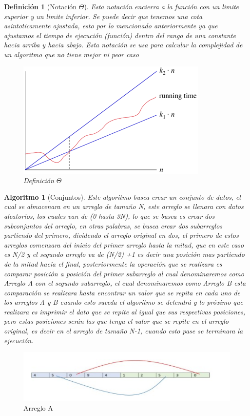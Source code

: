\documentclass[12pt,twoside]{article}
\newtheorem{defi}{Definición}
\newtheorem{algoritmo}{Algoritmo}
\begin{document}
\begin{defi}[Notaci\'on $\Theta$]
Esta notaci\'on encierra a la funci\'on con un limite superior y un limite inferior. Se puede decir que tenemos una cota asintoticamente ajustada, esto por lo mencionado anteriormente ya que ajustamos el tiempo de ejecuci\'on (funci\'on) dentro del rango de una constante hacia arriba y hacia abajo. Esta notaci\'on se usa para calcular la complejidad de un algoritmo que no tiene mejor ni peor caso

\begin{figure}[h!]
\centering
\includegraphics[scale=2.0]{big theta.png}
\caption{Definición $\Theta$}
\label{fig:universe}
\end{figure}
\end{defi}
\clearpage
\begin{algoritmo}[Conjuntos]
Este algoritmo busca crear un conjunto de datos, el cual se almacenara en un arreglo de tamaño N, este arreglo se llenara con datos aleatorios, los cuales van de (0 hasta 3N), lo que se busca es crear dos subconjuntos del arreglo, en otras palabras, se busca crear dos subarreglos partiendo del primero, dividendo el arreglo original en dos, el primero de estos arreglos comenzara del inicio del primer arreglo hasta la mitad, que en este caso es N/2 y el segundo arreglo va de (N/2) +1 es decir una posición mas partiendo de la mitad hacia el final, posteriormente la operación que se realizara es comparar posición a posición del primer subarreglo al cual denominaremos como Arreglo A con el segundo subarreglo, el cual denominaremos como Arreglo B esta comparación se realizara hasta encontrar un valor que se repita en cada uno de los arreglos A y B cuando esto suceda el algoritmo se detendrá y lo próximo que realizara es imprimir el dato que se repite al igual que sus respectivas posiciones, pero estas posiciones serán las que tenga el valor que se repite en el arreglo original, es decir en el arreglo de tamaño N-1, cuando esto pase se terminara la ejecución.
\end{algoritmo}
\begin{figure}[h!]
\centering
\includegraphics[scale=1.6]{pra1.jpg}
\caption{Arreglo A}
\label{fig:universe}
\end{figure}
\end{document}
